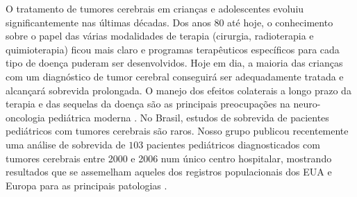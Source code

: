\documentclass[graybox]{svmult}
\begin{document}
O tratamento de tumores cerebrais em crianças e adolescentes evoluiu significantemente nas últimas décadas. Dos anos 80 até hoje, o conhecimento sobre o papel das várias modalidades de terapia (cirurgia, radioterapia e quimioterapia) ficou mais claro e programas terapêuticos específicos para cada tipo de doença puderam ser desenvolvidos. Hoje em dia, a maioria das crianças com um diagnóstico de tumor cerebral conseguirá ser adequadamente tratada e alcançará sobrevida prolongada. O manejo dos efeitos colaterais a longo prazo da terapia e das sequelas da doença são as principais preocupações na neuro-oncologia pediátrica moderna \cite{merchant}. No Brasil, estudos de sobrevida de pacientes pediátricos com tumores cerebrais são raros. Nosso grupo publicou recentemente uma análise de sobrevida de \(103\) pacientes pediátricos diagnosticados com tumores cerebrais entre 2000 e 2006 num único centro hospitalar, mostrando resultados que se assemelham aqueles dos registros populacionais dos EUA e Europa para as principais patologias \cite{araujo}.
\end{document}
